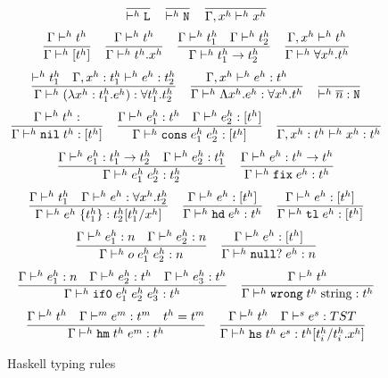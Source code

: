\begin{figure}[p]
\[
\frac
{}
{ \vdash^{h} \mathtt{L}}
\quad
\frac
{}
{ \vdash^{h} \mathtt{N}}
\quad
\frac
{}
{\Gamma , x^{h} \vdash^{h} x^{h}}
\]
\[
\frac
{\Gamma \vdash^{h} t^{h}}
{\Gamma \vdash^{h} [t^{h}]}
\quad
\frac
{\Gamma \vdash^{h} t^{h}}
{\Gamma \vdash^{h} t^{h} . x^{h}}
\quad
\frac
{\Gamma \vdash^{h} t^{h}_{1} \quad \Gamma \vdash^{h} t^{h}_{2}}
{\Gamma \vdash^{h} t^{h}_{1} \rightarrow t^{h}_{2}}
\quad
\frac
{\Gamma, x^{h} \vdash^{h} t^{h}}
{\Gamma \vdash^{h} \forall x^{h} . t^{h}}
\]
\bigskip
\[
\frac
{ \vdash^{h} t^{h}_{1} \quad \Gamma , x^{h} : t^{h}_{1} \vdash^{h} e^{h} : t^{h}_{2}}
{\Gamma \vdash^{h} (\lambda x^{h} : t^{h}_{1} . e^{h}) : \forall t^{h}_{1} . t^{h}_{2}}
\quad
\frac
{\Gamma , x^{h} \vdash^{h} e^{h} : t^{h}}
{\Gamma \vdash^{h} \Lambda x^{h} . e^{h} : \forall x^{h} . t^{h}}
\quad
\frac
{}
{ \vdash^{h} \overline{n} : \mathtt{N}}
\]
\[
\frac
{\judeh{\env}{\vartyh}}
{\judeh{\env}{\expnil{\vartyh}}{\tylist{\vartyh}}}
\quad
\frac
{\judeh{\env}{\first{\varexph}}{\vartyh} \quad \judeh{\env}{\second{\varexph}}{\tylist{\vartyh}}}
{\judeh{\env}{\expcons{\first{\varexph}}{\second{\varexph}}}{\tylist{\vartyh}}}
\quad
\frac
{}
{\judeh{\envexte{\tyvarh}{\vartyh}}{\tyvarh}{\vartyh}}
\]
\[
\frac{\Gamma\vdash^{h} e^{h}_1:t^{h}_1\rightarrow t^{h}_2\quad\Gamma\vdash^{h} e^{h}_2:t^{h}_1}{\Gamma\vdash^{h}e^{h}_{1} \; e^{h}_{2}:t^{h}_2}
\quad
\frac{\Gamma\vdash^{h} e^{h}:t^{h}\rightarrow t^{h}}{\Gamma\vdash^{h}\mathtt{fix}\;e^{h}:t^{h}}
\]
\[
\frac{\Gamma\vdash^{h} t^{h}_1\quad\Gamma\vdash^{h} e^{h}:\forall x^{h}.t^{h}_2}{\Gamma\vdash^{h} e^{h}\;\lbrace t^{h}_1\rbrace:t^{h}_2[t^{h}_1/x^{h}]}
\quad
\frac{\Gamma\vdash^{h} e^{h}:[t^{h}]}{\Gamma\vdash^{h}\mathtt{hd}\;e^{h}:t^{h}}
\quad
\frac{\Gamma\vdash^{h} e^{h}:[t^{h}]}{\Gamma\vdash^{h}\mathtt{tl}\;e^{h}:[t^{h}]}
\]
\[
\frac{\Gamma\vdash^{h} e^{h}_1:n\quad\Gamma\vdash^{h} e^{h}_2:n}{\Gamma\vdash^{h} o\;e^{h}_1\;e^{h}_2:n}
\quad
\frac{\Gamma\vdash^{h} e^{h}:[t^{h}]}{\Gamma\vdash^{h}\mathtt{null?}\;e^{h}:n}
\]
\[
\frac{\Gamma\vdash^{h} e^{h}_1:n\quad\Gamma\vdash^{h} e^{h}_2:t^{h}\quad\Gamma\vdash^{h} e^{h}_3:t^{h}}{\Gamma\vdash^{h}\mathtt{if0}\;e^{h}_1\;e^{h}_2\;e^{h}_3:t^{h}}
\quad
\frac{\Gamma\vdash^{h} t^{h}}{\Gamma\vdash^{h}\mathtt{wrong}\;t^{h}\;\mathrm{string}:t^{h}}
\]
\[
\frac{\Gamma\vdash^{h} t^{h}\quad\Gamma\vdash^me^m:t^m\quad t^{h}=t^m}{\Gamma\vdash^{h}\mathtt{hm}\;t^{h}\;e^m:t^{h}}
\quad
\frac{\Gamma\vdash^{h} t^{h}\quad\Gamma\vdash^se^s:TST}{\Gamma\vdash^{h}\mathtt{hs}\;t^{h}\;e^s:t^{h}[t^{h}_i/t^{h}_i.x^{h}]}
\]
\caption{Haskell typing rules}
\label{htr}
\end{figure}